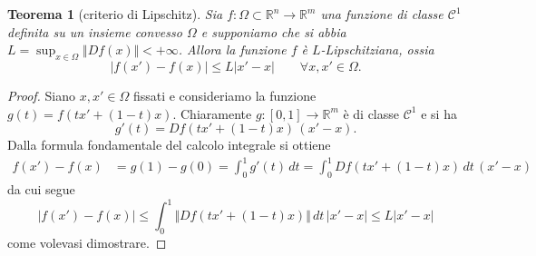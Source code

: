 \documentclass[italian]{article}
\newtheorem{theorem}{Teorema}
\theoremstyle{remark}
\newcommand{\R}{{\mathbb R}}            %
\newcommand{\CC}{{\mathcal C}}           %
\begin{document}
\begin{theorem}[criterio di Lipschitz]
Sia $f\colon \Omega\subset \R^n\to \R^m$ una funzione di classe
$\CC^1$ definita su un insieme convesso $\Omega$ 
e supponiamo che si abbia $L=\sup_{x\in \Omega} \Vert
Df(x)\Vert <+\infty$. Allora la funzione $f$ \`e $L$-Lipschitziana,
ossia
\[  
  | f(x')-f(x)| \le L | x'-x| \qquad \forall x,x'\in \Omega.
\]
\end{theorem}
\begin{proof}
Siano $x,x'\in \Omega$ fissati e
consideriamo la funzione $g(t)=f(tx'+(1-t)x)$. Chiaramente $g\colon
[0,1]\to \R^m$ \`e di classe $\CC^1$ e si ha
\[
  g'(t) = Df(tx'+(1-t)x)\, (x'-x).
\]
Dalla formula fondamentale del calcolo integrale si ottiene
\begin{align*}
  f(x')-f(x) &= g(1)-g(0) = \int_0^1 g'(t)\, dt
  =\int_0^1 Df(tx'+(1-t)x)\, dt\, (x'-x)
\end{align*}
da cui segue
\[
  |f(x')-f(x)| \le \int_0^1 \Vert Df(tx'+(1-t)x)\Vert \, dt\,
    |x'-x|
    \le L |x'-x|
\]
come volevasi dimostrare.
\end{proof}
\end{document}
